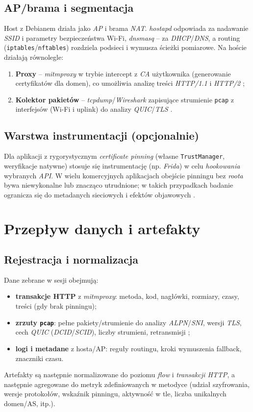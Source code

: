 \subsection{AP/brama i segmentacja}
Host z Debianem działa jako \emph{AP} i brama \emph{NAT}. \textit{hostapd} odpowiada za nadawanie \emph{SSID} i parametry bezpieczeństwa Wi-Fi, \textit{dnsmasq} – za \emph{DHCP}/\emph{DNS}, a routing (\texttt{iptables}/\texttt{nftables}) rozdziela podsieci i wymusza ścieżki pomiarowe. Na hoście działają równolegle:
\begin{enumerate}
  \item \textbf{Proxy} – \textit{mitmproxy} w trybie intercept z \emph{CA} użytkownika (generowanie certyfikatów dla domen), co umożliwia analizę treści \emph{HTTP/1.1} i \emph{HTTP/2} \cite{MitmproxyDocs,OWASPMASTGIntercept};
  \item \textbf{Kolektor pakietów} – \textit{tcpdump}/\textit{Wireshark} zapisujące strumienie \texttt{pcap} z interfejsów (Wi-Fi i uplink) do analizy \emph{QUIC}/\emph{TLS} \cite{WiresharkDocs,tcpdump,RFC9000,RFC8446}.
\end{enumerate}

\subsection{Warstwa instrumentacji (opcjonalnie)}
Dla aplikacji z rygorystycznym \emph{certificate pinning} (własne \texttt{TrustManager}, weryfikacje natywne) stosuje się instrumentację (np. \textit{Frida}) w celu \emph{hookowania} wybranych \emph{API}. W wielu komercyjnych aplikacjach obejście pinningu bez \textit{roota} bywa niewykonalne lub znacząco utrudnione; w takich przypadkach badanie ogranicza się do metadanych sieciowych i efektów objawowych \cite{OWASPMASTGPinning,Frida}.

\section{Przepływ danych i artefakty}
\subsection{Rejestracja i normalizacja}
Dane zebrane w sesji obejmują:
\begin{itemize}
  \item \textbf{transakcje HTTP} z \textit{mitmproxy}: metoda, kod, nagłówki, rozmiary, czasy, treści (gdy brak pinningu);
  \item \textbf{zrzuty \texttt{pcap}}: pełne pakiety/strumienie do analizy \emph{ALPN}/\emph{SNI}, wersji \emph{TLS}, cech \emph{QUIC} (\emph{DCID}/\emph{SCID}), liczby strumieni, retransmisji \cite{RFC9113,RFC9114,RFC9000};
  \item \textbf{logi i metadane} z hosta/AP: reguły routingu, kroki wymuszenia fallback, znaczniki czasu.
\end{itemize}
Artefakty są następnie normalizowane do poziomu \emph{flow} i \emph{transakcji HTTP}, a następnie agregowane do metryk zdefiniowanych w metodyce (udział szyfrowania, wersje protokołów, wskaźnik pinningu, aktywność w tle, liczba unikalnych domen/AS, itp.).


